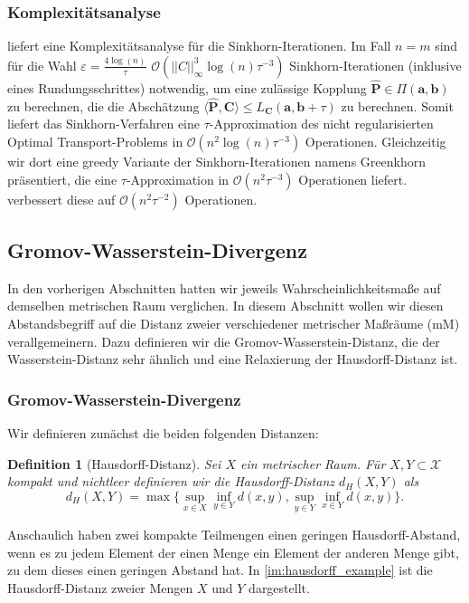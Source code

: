 \documentclass[11pt,a4paper]{article}
\def\emph#1{\textit{#1}}
\newtheorem{definition}[theorem]{Definition}
\numberwithin{equation}{section}
\begin{document}
	\subsubsection{Komplexitätsanalyse}
	\cite{altschuler2017near} liefert eine Komplexitätsanalyse für die Sinkhorn-Iterationen. Im Fall $n=m$ sind für die Wahl $\varepsilon = \frac{4 \log (n)}{\tau}$ $\mathcal{O}(||C||_\infty^3 \log (n)\tau ^{-3})$ Sinkhorn-Iterationen (inklusive eines Rundungsschrittes) notwendig, um eine zulässige Kopplung $\hat{\boldsymbol{P}} \in \Pi(\boldsymbol{a}, \boldsymbol{b})$ zu berechnen, die die Abschätzung $\langle \hat{\boldsymbol{P}}, \boldsymbol{C} \rangle \leq L_{\boldsymbol{C}}(\boldsymbol{a}, \boldsymbol{b} +  \tau)$ zu berechnen. Somit liefert das Sinkhorn-Verfahren eine $\tau$-Approximation des nicht regularisierten Optimal Transport-Problems in $\mathcal{O}(n^2 \log (n)\tau ^{-3})$ Operationen.
	Gleichzeitig wir dort eine greedy Variante der Sinkhorn-Iterationen namens Greenkhorn präsentiert, die eine $\tau$-Approximation in $\mathcal{O}(n^2\tau^{-3})$ Operationen liefert.
	\cite{dvurechensky2018computational} verbessert diese auf $\mathcal{O}(n^2\tau^{-2})$ Operationen.
	\subsection{Gromov-Wasserstein-Divergenz}
	In den vorherigen Abschnitten hatten wir jeweils Wahrscheinlichkeitsmaße auf demselben metrischen Raum verglichen. In diesem Abschnitt wollen wir diesen Abstandsbegriff auf die Distanz zweier verschiedener metrischer Maßräume (mM) verallgemeinern. Dazu definieren wir die Gromov-Wasserstein-Distanz, die der Wasserstein-Distanz sehr ähnlich und eine Relaxierung der Hausdorff-Distanz ist.
	
	\subsubsection{Gromov-Wasserstein-Divergenz}
	\cite{vialard2019elementary}
	Wir definieren zunächst die beiden folgenden Distanzen:
	
	\begin{definition}[Hausdorff-Distanz]
		Sei $X$ ein metrischer Raum.
		Für  $X,Y \subset \mathscr{X}$ kompakt und nichtleer definieren wir die \emph{Hausdorff-Distanz} $d_H(X,Y)$ als
		\begin{equation}
		d_H(X,Y) = \max \lbrace \sup_{x \in X} \inf_{y \in Y} d(x,y), \sup_{y \in Y} \inf_{x \in Y} d(x,y) \rbrace .
		\end{equation} 
		
	\end{definition}
	Anschaulich haben zwei kompakte Teilmengen einen geringen Hausdorff-Abstand, wenn es zu jedem Element der einen Menge ein Element der anderen Menge gibt, zu dem dieses einen geringen Abstand hat. In \autoref{im:hausdorff_example} ist die Hausdorff-Distanz zweier Mengen $X$ und $Y$ dargestellt.
	
\end{document}
